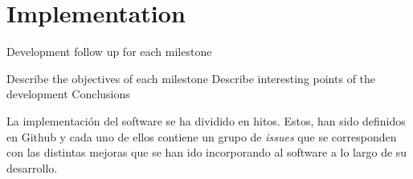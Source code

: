 \chapter{Implementation}

Development follow up for each milestone 

Describe the objectives of each milestone
Describe interesting points of the development
Conclusions



La implementación del software se ha dividido en hitos. Estos, han sido definidos en Github
y cada uno de ellos contiene un grupo de \textit{issues} que se corresponden con las distintas
mejoras que se han ido incorporando al software a lo largo de su desarrollo.\\

